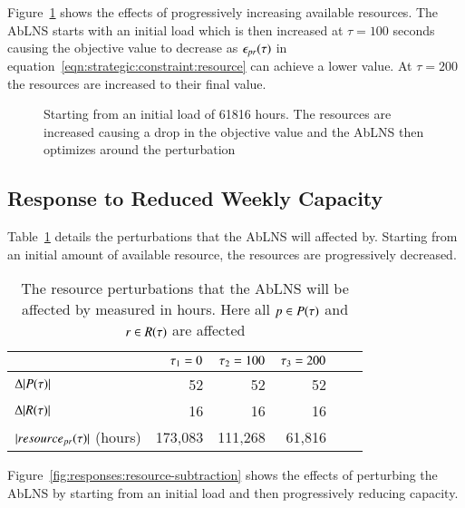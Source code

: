 Figure~\ref{fig:responses:resources-addition} shows the effects of progressively
increasing  available resources. The AbLNS starts with an initial load which is
then increased at $\tau = 100$ seconds causing the objective value to decrease
as $\epsilon_{pr}(\tau)$ in equation~\ref{eqn:strategic:constraint:resource}
can achieve a lower value. At $\tau = 200$ the resources are increased
to their final value.

\begin{figure}[H]%
	\centering
	\resizebox{10cm}{!}{
		
	}
	\caption{Starting from an initial load of 61816 hours. The resources are increased causing a drop in the
		objective value and the AbLNS then optimizes around the perturbation
	}\label{fig:responses:resources-addition}
\end{figure}

\subsection{Response to Reduced Weekly Capacity}\label{sec:results:reduced_weekly_capacity}
Table~\ref{tab:resources:resource-subtraction} details the perturbations that the
AbLNS will affected by. Starting from an initial amount of available
resource, the resources are progressively decreased.
\begin{table}[H]
	\centering
	\begin{tabular}{lrrrrr}
	\toprule
	                                    & $\tau_1 = 0$ & $\tau_2 = 100$ & $\tau_3 = 200$ \\ \midrule
	$\Delta |P(\tau)|$               & 52                     & 52                     & 52                   \\ \midrule
	$\Delta |R(\tau)|$             & 16                     & 16                     & 16                   \\ \midrule
	$ |resource_{pr}(\tau)|$ (hours)& 173,083                 & 111,268                 & 61,816                \\ \bottomrule
	\end{tabular}
	\caption{The resource perturbations that the AbLNS will be affected by measured in hours.
		Here all $p \in P(\tau)$ and $r \in R(\tau)$ are 
		affected}\label{tab:resources:resource-subtraction}
\end{table}

Figure~\ref{fig:responses:resource-subtraction} shows the effects of perturbing
the AbLNS by starting from an initial load and then progressively reducing
capacity.

